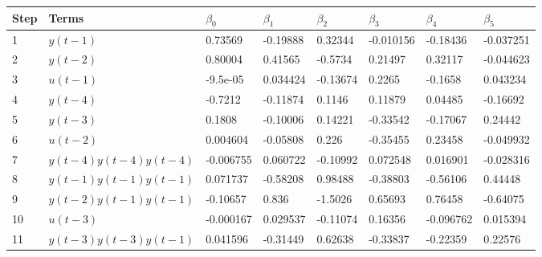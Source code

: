 \begin{tabular}{llllllll}
Step & Terms & $\beta_{0}$ & $\beta_{1}$ & $\beta_{2}$ & $\beta_{3}$ & $\beta_{4}$ & $\beta_{5}$ \\ 
\hline 
1 & $y(t-1)$ & 0.73569 & -0.19888 & 0.32344 & -0.010156 & -0.18436 & -0.037251 \\ 
2 & $y(t-2)$ & 0.80004 & 0.41565 & -0.5734 & 0.21497 & 0.32117 & -0.044623 \\ 
3 & $u(t-1)$ & -9.5e-05 & 0.034424 & -0.13674 & 0.2265 & -0.1658 & 0.043234 \\ 
4 & $y(t-4)$ & -0.7212 & -0.11874 & 0.1146 & 0.11879 & 0.04485 & -0.16692 \\ 
5 & $y(t-3)$ & 0.1808 & -0.10006 & 0.14221 & -0.33542 & -0.17067 & 0.24442 \\ 
6 & $u(t-2)$ & 0.004604 & -0.05808 & 0.226 & -0.35455 & 0.23458 & -0.049932 \\ 
7 & $y(t-4)y(t-4)y(t-4)$ & -0.006755 & 0.060722 & -0.10992 & 0.072548 & 0.016901 & -0.028316 \\ 
8 & $y(t-1)y(t-1)y(t-1)$ & 0.071737 & -0.58208 & 0.98488 & -0.38803 & -0.56106 & 0.44448 \\ 
9 & $y(t-2)y(t-1)y(t-1)$ & -0.10657 & 0.836 & -1.5026 & 0.65693 & 0.76458 & -0.64075 \\ 
10 & $u(t-3)$ & -0.000167 & 0.029537 & -0.11074 & 0.16356 & -0.096762 & 0.015394 \\ 
11 & $y(t-3)y(t-3)y(t-1)$ & 0.041596 & -0.31449 & 0.62638 & -0.33837 & -0.22359 & 0.22576 \\ 
\hline 
\end{tabular}
